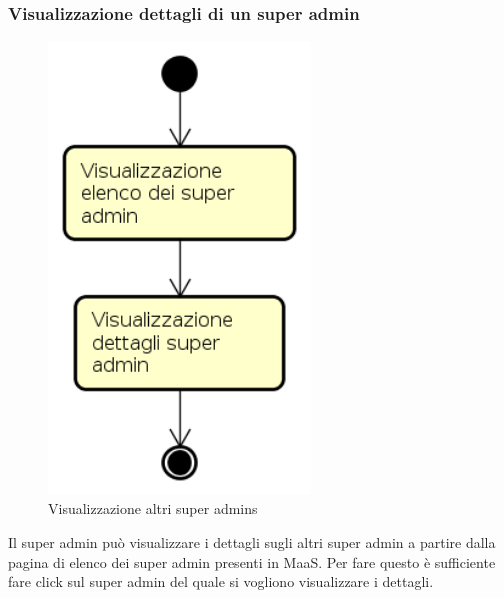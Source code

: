 \subsubsection{Visualizzazione dettagli di un super admin}
\begin{figure}[H]
\begin{center}
\includegraphics[height=12cm]{res/sections/backend/activities/visualizzazioneDettagliSuperAdminSA.png}
\caption{Visualizzazione altri super admins}
\end{center}
\end{figure}
Il super admin può visualizzare i dettagli sugli altri super admin a partire dalla pagina di elenco dei super admin presenti in MaaS. Per fare questo è sufficiente fare click sul super admin del quale si vogliono visualizzare i dettagli.
